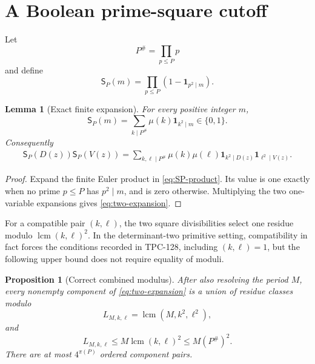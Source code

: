 \documentclass[11pt]{article}
\newtheorem{proposition}[theorem]{Proposition}
\newtheorem{lemma}[theorem]{Lemma}
\theoremstyle{definition}
\theoremstyle{remark}
\newcommand{\one}{\mathbf 1}
\begin{document}
\section{A Boolean prime-square cutoff}

Let
\[
 P^\#=\prod_{p\le P}p
\]
and define
\begin{equation}
 \mathsf S_P(m)
 =
 \prod_{p\le P}(1-\one_{p^2\mid m}).
\label{eq:SP-product}
\end{equation}

\begin{lemma}[Exact finite expansion]
\label{lem:expansion}
For every positive integer \(m\),
\begin{equation}
 \mathsf S_P(m)
 =
 \sum_{k\mid P^\#}\mu(k)\one_{k^2\mid m}
 \in\{0,1\}.
\label{eq:SP-expansion}
\end{equation}
Consequently
\begin{align}
 \mathsf S_P(D(z))\mathsf S_P(V(z))
 =
 \sum_{k,\ell\mid P^\#}
 \mu(k)\mu(\ell)
 \one_{k^2\mid D(z)}
 \one_{\ell^2\mid V(z)}.
\label{eq:two-expansion}
\end{align}
\end{lemma}

\begin{proof}
Expand the finite Euler product in \eqref{eq:SP-product}.  Its value
is one exactly when no prime \(p\le P\) has \(p^2\mid m\), and is
zero otherwise.  Multiplying the two one-variable expansions gives
\eqref{eq:two-expansion}.
\end{proof}

For a compatible pair \((k,\ell)\), the two square divisibilities
select one residue modulo \(\operatorname{lcm}(k,\ell)^2\).  In the
determinant-two primitive setting, compatibility in fact forces the
conditions recorded in TPC-128, including \((k,\ell)=1\), but the
following upper bound does not require equality of moduli.

\begin{proposition}[Correct combined modulus]
\label{prop:modulus}
After also resolving the period \(M\), every nonempty component of
\eqref{eq:two-expansion} is a union of residue classes modulo
\[
 L_{M,k,\ell}
 =
 \operatorname{lcm}(M,k^2,\ell^2),
\]
and
\begin{equation}
 L_{M,k,\ell}
 \le
 M\operatorname{lcm}(k,\ell)^2
 \le M(P^\#)^2.
\label{eq:modulus}
\end{equation}
There are at most \(4^{\pi(P)}\) ordered component pairs.
\end{proposition}
\end{document}
